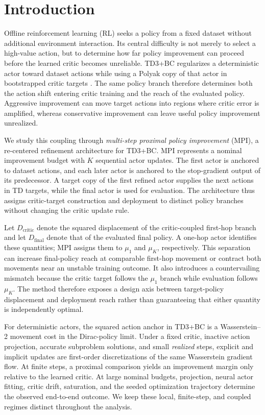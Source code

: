 \section{Introduction}
\label{sec:introduction}

Offline reinforcement learning (RL) seeks a policy from a fixed dataset without additional environment interaction. Its central difficulty is not merely to select a high-value action, but to determine how far policy improvement can proceed before the learned critic becomes unreliable. TD3+BC regularizes a deterministic actor toward dataset actions while using a Polyak copy of that actor in bootstrapped critic targets \citep{fujimoto2021minimalist}. The same policy branch therefore determines both the action shift entering critic training and the reach of the evaluated policy. Aggressive improvement can move target actions into regions where critic error is amplified, whereas conservative improvement can leave useful policy improvement unrealized.

We study this coupling through \emph{multi-step proximal policy improvement} (MPI), a re-centered refinement architecture for TD3+BC. MPI represents a nominal improvement budget with $K$ sequential actor updates. The first actor is anchored to dataset actions, and each later actor is anchored to the stop-gradient output of its predecessor. A target copy of the first refined actor supplies the next actions in TD targets, while the final actor is used for evaluation. The architecture thus assigns critic-target construction and deployment to distinct policy branches without changing the critic update rule.

Let $D_{\mathrm{critic}}$ denote the squared displacement of the critic-coupled first-hop branch and let $D_{\mathrm{final}}$ denote that of the evaluated final policy. A one-hop actor identifies these quantities; MPI assigns them to $\mu_1$ and $\mu_K$, respectively. This separation can increase final-policy reach at comparable first-hop movement or contract both movements near an unstable training outcome. It also introduces a countervailing mismatch because the critic target follows the $\mu_1$ branch while evaluation follows $\mu_K$. The method therefore exposes a design axis between target-policy displacement and deployment reach rather than guaranteeing that either quantity is independently optimal.

For deterministic actors, the squared action anchor in TD3+BC is a Wasserstein--2 movement cost in the Dirac-policy limit. Under a fixed critic, inactive action projection, accurate subproblem solutions, and small \emph{realized} steps, explicit and implicit updates are first-order discretizations of the same Wasserstein gradient flow. At finite steps, a proximal comparison yields an improvement margin only relative to the learned critic. At large nominal budgets, projection, neural actor fitting, critic drift, saturation, and the seeded optimization trajectory determine the observed end-to-end outcome. We keep these local, finite-step, and coupled regimes distinct throughout the analysis.

